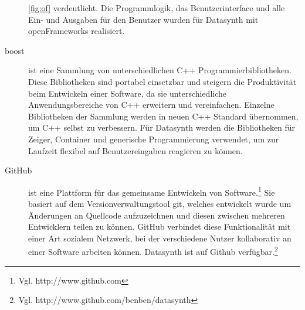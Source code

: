 \documentclass[a4paper, 12pt, DIVcalc, onepage, pdftex, headsepline, footsepline]{scrreprt}
\begin{document}
\begin{description}
\ref{fig:of} verdeutlicht. 
Die Programmlogik, das Benutzerinterface und alle Ein- und
Ausgaben für den Benutzer wurden für Datasynth mit openFrameworks
realisiert.
\item[boost]
ist eine Sammlung von unterschiedlichen C++ Programmierbibliotheken.
Diese Bibliotheken sind portabel einsetzbar und steigern die
Produktivität beim Entwickeln einer Software, da sie unterschiedliche
Anwendungsbereiche von C++ erweitern und vereinfachen.
Einzelne Bibliotheken der Sammlung werden in neuen C++ Standard
übernommen, um C++ selbst zu verbessern.
Für Datasynth werden die Bibliotheken für Zeiger, Container
und generische Programmierung verwendet, um zur Laufzeit flexibel
auf Benutzereingaben reagieren zu können.
\item[GitHub]
ist eine Plattform für das gemeinsame Entwickeln von Software.\footnote{Vgl. http://www.github.com}
Sie basiert auf dem Versionverwaltungstool git, welches entwickelt wurde
um Änderungen an Quellcode aufzuzeichnen und diesen zwischen mehreren
Entwicklern teilen zu können. GitHub verbindet diese Funktionalität mit
einer Art sozialem Netzwerk, bei der verschiedene Nutzer kollaborativ
an einer Software arbeiten können. Datasynth ist auf Github verfügbar.\footnote{Vgl. http://www.github.com/benben/datasynth}
\end{description}
\end{document}
